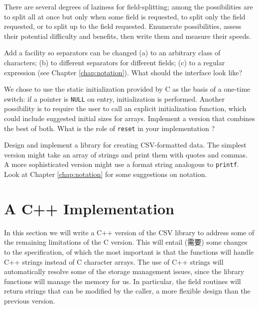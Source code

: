\begin{exercise}
    There are several degrees of laziness for field-splitting; among the
    possibilities are to split all at once but only when some field is
    requested, to split only the field requested, or to split up to the
    field requested. Enumerate possibilities, assess their potential
    difficulty and benefits, then write them and measure their speeds.
\end{exercise}

\begin{exercise}
    Add a facility so separators can be changed (a) to an arbitrary class
    of characters; (b) to different separators for different fields; (c) to
    a regular expression (see Chapter \ref{chap:notation}). What should the
    interface look like?
\end{exercise}

\begin{exercise}
    We chose to use the static initialization provided by C as the basis of
    a one-time switch: if a pointer is \verb'NULL' on entry, initialization
    is performed. Another possibility is to require the user to call an
    explicit initialization function, which could include suggested initial
    sizes for arrays. Implement a version that combines the best of both.
    What is the role of \verb'reset' in your implementation ?
\end{exercise}

\begin{exercise}
    Design and implement a library for creating CSV-formatted data. The
    simplest version might take an array of strings and print them with
    quotes and commas. A more sophisticated version might use a format
    string analogous to \verb'printf'.  Look at Chapter \ref{chap:notation}
    for some suggestions on notation.
\end{exercise}

\section{A C++ Implementation}
\label{sec:a_c++_implementation}

In this section we will write a C++ version of the CSV library to address
some of the remaining limitations of the C version. This will entail (需要)
some changes to the specification, of which the most important is that the
functions will handle C++ strings instead of C character arrays. The use of
C++ strings will automatically resolve some of the storage management
issues, since the library functions will manage the memory for us. In
particular, the field routines will return strings that can be modified by
the caller, a more flexible design than the previous version.

